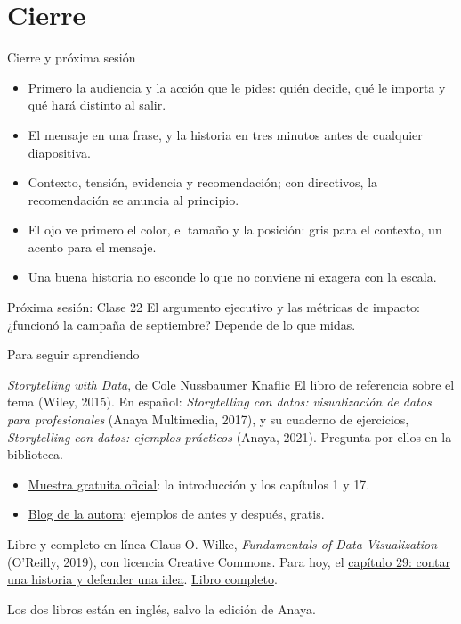 \documentclass[aspectratio=169,11pt]{beamer}
\begin{document}
\section{Cierre}
\begin{frame}[t]{Cierre y próxima sesión}
  \begin{itemize}
    \small
    \item Primero la audiencia y la acción que le pides: quién decide, qué le
      importa y qué hará distinto al salir.
    \item El mensaje en una frase, y la historia en tres minutos antes de
      cualquier diapositiva.
    \item Contexto, tensión, evidencia y recomendación; con directivos, la
      recomendación se anuncia al principio.
    \item El ojo ve primero el color, el tamaño y la posición: gris para el
      contexto, un acento para el mensaje.
    \item Una buena historia no esconde lo que no conviene ni exagera con la
      escala.
  \end{itemize}
  \vspace{0.15cm}
  \begin{block}{Próxima sesión: Clase 22}
    \small El argumento ejecutivo y las métricas de impacto: ¿funcionó la
    campaña de septiembre? Depende de lo que midas.
  \end{block}
\end{frame}

\begin{frame}[t]{Para seguir aprendiendo}
  \small
  \begin{block}{\emph{Storytelling with Data}, de Cole Nussbaumer Knaflic}
    \footnotesize El libro de referencia sobre el tema (Wiley, 2015). En
    español: \emph{Storytelling con datos: visualización de datos para
    profesionales} (Anaya Multimedia, 2017), y su cuaderno de ejercicios,
    \emph{Storytelling con datos: ejemplos prácticos} (Anaya, 2021).
    Pregunta por ellos en la biblioteca.
    \begin{itemize}
      \footnotesize
      \item \href{https://www.storytellingwithdata.com/book}{\color{esumerOrange}Muestra gratuita oficial}:
        la introducción y los capítulos 1 y 17.
      \item \href{https://www.storytellingwithdata.com/blog}{\color{esumerOrange}Blog de la autora}:
        ejemplos de antes y después, gratis.
    \end{itemize}
  \end{block}
  \begin{exampleblock}{Libre y completo en línea}
    \footnotesize Claus O. Wilke, \emph{Fundamentals of Data Visualization}
    (O'Reilly, 2019), con licencia Creative Commons. Para hoy, el
    \href{https://clauswilke.com/dataviz/telling-a-story.html}{\color{esumerOrange}capítulo 29: contar una historia y defender una idea}.
    \href{https://clauswilke.com/dataviz/}{\color{esumerOrange}Libro completo}.
  \end{exampleblock}
  \scriptsize Los dos libros están en inglés, salvo la edición de Anaya.
\end{frame}
\end{document}
